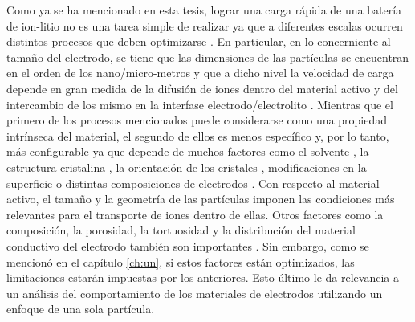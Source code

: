 Como ya se ha mencionado en esta tesis, lograr una carga rápida de una batería 
de ion-litio no es una tarea simple de realizar ya que a diferentes escalas 
ocurren distintos procesos que deben optimizarse \cite{franco2013}. En 
particular, en lo concerniente al tamaño del electrodo, se tiene que las dimensiones de las partículas se encuentran
en el orden de los nano/micro-metros y que a dicho nivel la velocidad de carga 
depende en gran medida de la difusión de iones dentro del material activo y del
intercambio de los mismo en la interfase electrodo/electrolito \cite{weiss2021}.
Mientras que el primero de los procesos mencionados puede considerarse como una 
propiedad intrínseca del material, el segundo de ellos es menos específico y, 
por lo tanto, más configurable ya que depende de muchos factores como el 
solvente \cite{levin2017}, la estructura cristalina \cite{li2022}, la
orientación de los cristales \cite{mala2020}, modificaciones en la superficie o 
distintas composiciones de electrodos \cite{kaur2022}. Con respecto al material
activo, el tamaño y la geometría de las partículas imponen las condiciones más
relevantes para el transporte de iones dentro de ellas. Otros factores como la 
composición, la porosidad, la tortuosidad y la distribución del material 
conductivo del electrodo también son importantes \cite{weiss2021}. Sin embargo,
como se mencionó en el capítulo \ref{ch:un}, si estos factores están 
optimizados, las limitaciones estarán impuestas por los anteriores. Esto último
le da relevancia a un análisis del comportamiento de los materiales de electrodos
utilizando un enfoque de una sola partícula.

